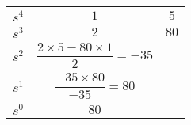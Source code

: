 \begin{tabular}{|c|c|c|}
\hline 
$s^4$ & $ 1 $ & $5$ \\
\hline
$s^3$ &$2$&$80$ \\
\hline
$s^2 $& $\dfrac{2\times 5-80\times1}{2}= 
 -35$ & \\
\hline
$s^1 $& $ \dfrac{-35 \times 80}{-35} = 80$ &\\
\hline
$s^0$&$80$&\\
\hline
\end{tabular}
